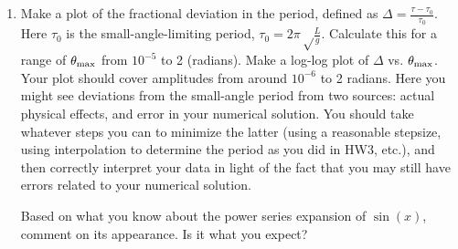 \documentclass[12pt]{article}
\begin{document}
\begin{enumerate}
\item Make a plot of the fractional deviation in the period, defined as $\Delta = \frac{\tau-\tau_0}{\tau_0}$. Here $\tau_0$ is the small-angle-limiting period, $\tau_0=2\pi\sqrt\frac{L}{g}$. Calculate this for a range of $\theta_{\rm max}$ from $10^{-5}$ to 2 (radians). Make a log-log plot of $\Delta$ vs. $\theta_{\rm max}$. Your plot should
cover amplitudes from around $10^{-6}$ to 2 radians. Here you might see
deviations from the small-angle period from two sources: actual physical effects, and error in your numerical solution. You should take whatever steps you can to minimize
the latter (using a reasonable stepsize, using interpolation to determine the period as you did in HW3, etc.), and then correctly interpret your data in light of the fact
that you may still have errors related to your numerical solution.

Based on what you know about the power series expansion of $\sin(x)$, comment on its appearance. Is it what you expect?


\end{enumerate}
\end{document}
